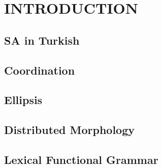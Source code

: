 \chapter{\MakeUppercase{introduction}}
\setcounter{exx}{0}

\section{SA in Turkish} \label{whatisSA}


\section{Coordination}

\section{Ellipsis}

\section{Distributed Morphology}

\section{Lexical Functional Grammar}



